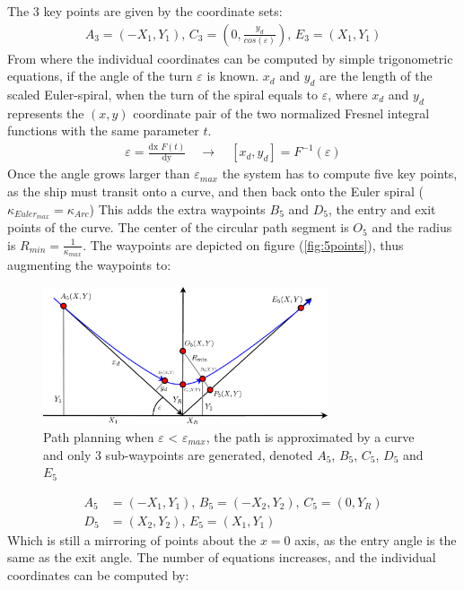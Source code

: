 \documentclass{ifacconf}
\begin{document}
The 3 key points are given by the coordinate sets:
\begin{align}
A_3 = (-X_1,Y_1),\, C_3 = (0,\frac{y_d}{cos(\varepsilon)}),\, E_3 = (X_1,Y_1)
\end{align}
From where the individual coordinates can be computed by simple trigonometric equations, if the angle of the turn $\varepsilon$ is known. $x_d$ and $y_d$ are the length of the scaled Euler-spiral, when the turn of the spiral equals to $\varepsilon$, where $x_d$ and $y_d$ represents the $(x,y)$ coordinate pair of the two normalized Fresnel integral functions with the same parameter $t$.
\begin{align}
\varepsilon = \frac{\textrm{dx }F(t)}{\textrm{dy}} \quad \to \quad [x_d,y_d] = F^{-1}(\varepsilon)
\end{align}
Once the angle grows larger than $\varepsilon_{max}$ the system has to compute five key points, as the ship must transit onto a curve, and then back onto the Euler spiral ($\kappa_{Euler_{max}} = \kappa_{Arc}$) This adds the extra waypoints $B_5$ and $D_5$, the entry and exit points of the curve. The center of the circular path segment is $O_5$ and the radius is $R_{min} = \frac{1}{\kappa_{max}}$. The waypoints are depicted on figure (\ref{fig:5points}), thus augmenting the waypoints to:
\begin{figure}
	\begin{center}
		\includegraphics[width=8.4cm]{img/5Points}    %
		\caption{Path planning when $\varepsilon$ < $\varepsilon_{max}$, the path is approximated by a curve and only 3 sub-waypoints are generated, denoted $A_5$, $B_5$, $C_5$, $D_5$ and $E_5$}  %
		\label{fig:3points}               
	\end{center}                                 %
\end{figure}
\begin{align}
A_5 &= (-X_1,Y_1),\, B_5 = (-X_2,Y_2),\, C_5 = (0,Y_R)\\
D_5 &= (X_2,Y_2),\, E_5 = (X_1,Y_1)
\end{align}
Which is still a mirroring of points about the $x=0$ axis, as the entry angle is the same as the exit angle. The number of equations increases, and the individual coordinates can be computed by:
\end{document}

